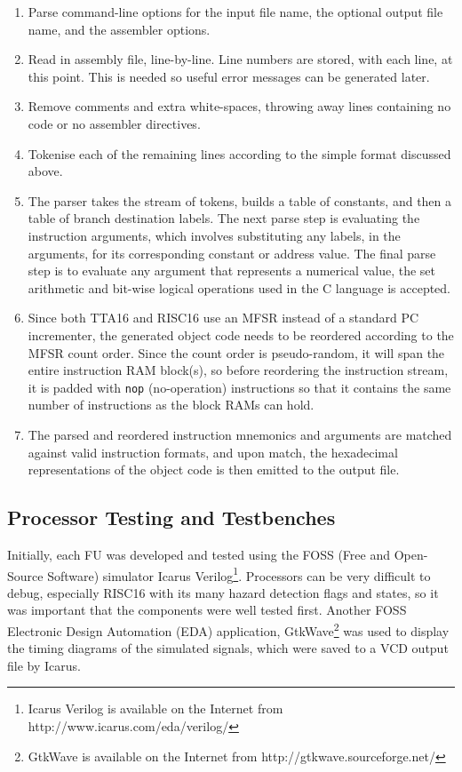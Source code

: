 \begin{enumerate}
  \item Parse command-line options for the input file name, the optional output
  file name, and the assembler options.
  \item Read in assembly file, line-by-line. Line numbers are
  stored, with each line, at this point. This is needed so useful error
  messages can be generated later.
  \item Remove comments and extra white-spaces, throwing away lines containing
  no code or no assembler directives.
  \item Tokenise each of the remaining lines according to the simple format
  discussed above.
  \item The parser takes the stream of tokens, builds a table of constants, and
  then a table of branch destination labels. The next parse step is
  evaluating the instruction arguments, which involves substituting any
  labels, in the arguments, for its corresponding constant or address value.
  The final parse step is to evaluate any argument that represents a numerical
  value, the set arithmetic and bit-wise logical operations used in the C
  language is accepted.
  \item Since both TTA16 and RISC16 use an MFSR instead of a standard PC
  incrementer, the generated object code needs to be reordered according to
  the MFSR count order. Since the count order is pseudo-random, it will span
  the entire instruction RAM block(s), so before reordering the instruction
  stream, it is padded with \texttt{nop} (no-operation) instructions so that it
  contains the same number of instructions as the block RAMs can hold.
  \item The parsed and reordered instruction mnemonics and arguments are
  matched against valid instruction formats, and upon match, the hexadecimal
  representations of the object code is then emitted to the output file.
\end{enumerate}


\subsection{Processor Testing and Testbenches}
Initially, each FU was developed and tested using the FOSS (Free and Open-Source
Software) simulator Icarus Verilog\footnote{Icarus Verilog is available on the
Internet from http://www.icarus.com/eda/verilog/}. Processors can be very
difficult to debug, especially RISC16 with its many hazard detection flags and
states, so it was important that the components were well tested first. Another
FOSS Electronic Design Automation (EDA) application, GtkWave\footnote{GtkWave is available on
the Internet from http://gtkwave.sourceforge.net/} was used to display the timing
diagrams of the simulated signals, which were saved to a VCD output file by Icarus.

